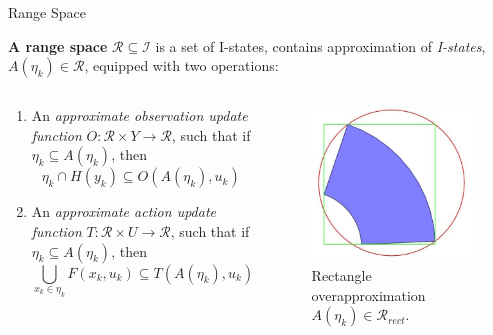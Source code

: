 \documentclass[10pt]{beamer}
\begin{document}
\begin{frame}{Range Space}
\begin{definition}{\textbf{A range space}}
 $\mathcal{R} \subseteq \mathcal{I}$ is a set of I-states, contains
 approximation of \emph{I-states}, $A(\eta_k) \in \mathcal{R}$, equipped with
 two operations:
\end{definition}
\begin{columns}
\begin{column}{.5\textwidth}
\begin{enumerate}
\item An \emph{approximate observation update function} $O: \mathcal{R} \times
		Y \to \mathcal{R}$, such that if $\eta_k \subseteq A(\eta_k)$, then
			$$\eta_k \cap H(y_k) \subseteq O(A(\eta_k), u_k)$$
\item An \emph{approximate action update function} $T: \mathcal{R} \times U \to
		\mathcal{R}$, such that if $\eta_k \subseteq A(\eta_k)$, then
			$$\bigcup_{x_k \in \eta_k} F(x_k, u_k) \subseteq T(A(\eta_k), u_k)$$
\end{enumerate}
\end{column}
\begin{column}{.4\textwidth}
  \begin{figure}
    \includegraphics[scale=0.3]{figs/rangespace.jpg}
    \caption{Rectangle overapproximation $A(\eta_k) \in \mathcal{R}_{rect}$.}
  \end{figure}
\end{column}
\end{columns}
\end{frame}
\end{document}
